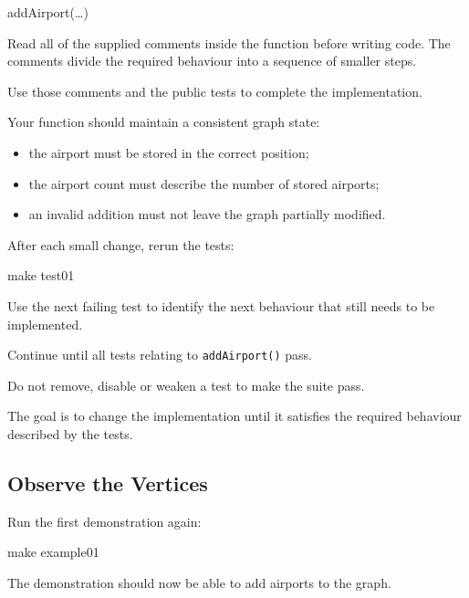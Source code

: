 \documentclass{csc2059practical}
\begin{document}
\begin{cppcode}
addAirport(…)
\end{cppcode}

Read all of the supplied comments inside the function before writing code. The
comments divide the required behaviour into a sequence of smaller steps.

Use those comments and the public tests to complete the implementation.

Your function should maintain a consistent graph state:

\begin{itemize}
\item the airport must be stored in the correct position;
\item the airport count must describe the number of stored airports;
\item an invalid addition must not leave the graph partially modified.
\end{itemize}

After each small change, rerun the tests:

\begin{terminal}
make test01
\end{terminal}

Use the next failing test to identify the next behaviour that still needs to be
implemented.

Continue until all tests relating to \texttt{addAirport()} pass.

\begin{importantnote}
Do not remove, disable or weaken a test to make the suite pass.

The goal is to change the implementation until it satisfies the required
behaviour described by the tests.
\end{importantnote}


\subsection{Observe the Vertices}

Run the first demonstration again:

\begin{terminal}
make example01
\end{terminal}

The demonstration should now be able to add airports to the graph.
\end{document}
